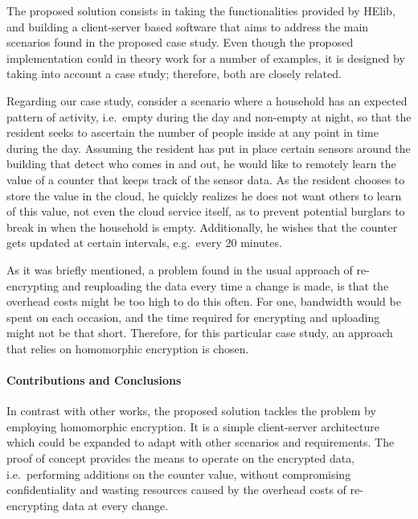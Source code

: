 The proposed solution consists in taking the functionalities provided by HElib, and building a client-server based software that aims to address the main scenarios found in the proposed case study. Even though the proposed implementation could in theory work for a number of examples, it is designed by taking into account a case study; therefore, both are closely related.

Regarding our case study, consider a scenario where a household has an expected pattern of activity, i.e.\ empty during the day and non-empty at night, so that the resident seeks to ascertain the number of people inside at any point in time during the day. Assuming the resident has put in place certain sensors around the building that detect who comes in and out, he would like to remotely learn the value of a counter that keeps track of the sensor data. As the resident chooses to store the value in the cloud, he quickly realizes he does not want others to learn of this value, not even the cloud service itself, as to prevent potential burglars to break in when the household is empty. Additionally, he wishes that the counter gets updated at certain intervals, e.g.\ every 20 minutes. 

As it was briefly mentioned, a problem found in the usual approach of re-encrypting and reuploading the data every time a change is made, is that the overhead costs might be too high to do this often. For one, bandwidth would be spent on each occasion, and the time required for encrypting and uploading might not be that short. Therefore, for this particular case study, an approach that relies on homomorphic encryption is chosen.

\paragraph{Contributions and Conclusions}
In contrast with other works, the proposed solution tackles the problem by employing homomorphic encryption. It is a simple client-server architecture which could be expanded to adapt with other scenarios and requirements. The proof of concept provides the means to operate on the encrypted data, i.e.\ performing additions on the counter value, without compromising confidentiality and wasting resources caused by the overhead costs of re-encrypting data at every change.


